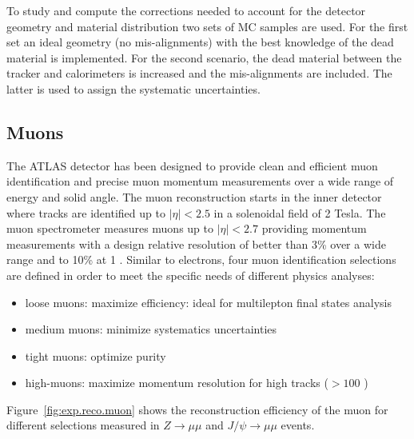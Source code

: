 To study and compute the corrections needed to account for the detector geometry and material distribution
two sets of MC samples are used. For the first set an ideal geometry (no mis-alignments) with the best
knowledge of the dead material is implemented. For the second scenario, the dead material between the
tracker and calorimeters is increased and the mis-alignments are included. The latter is used to assign the
systematic uncertainties.








\subsection{Muons}

The ATLAS detector has been designed to provide clean and efficient 
muon identification and precise muon momentum measurements over 
a wide range of energy and solid angle. 
The muon  reconstruction starts in the inner 
detector where tracks are identified up to $|\eta|<2.5$ in a solenoidal field of 2 Tesla.
The muon spectrometer  measures  muons up to $|\eta|<2.7$  
providing momentum measurements with a design relative resolution of better than 3\% over a wide 
\pt range and to 10\% at 1 \TeV.
Similar to electrons, four muon identification selections are defined in order to meet 
the specific needs of different physics analyses:
\begin{itemize}
\item loose muons: maximize efficiency: ideal for multilepton final states analysis
\item medium muons: minimize systematics uncertainties
\item tight muons: optimize  purity
\item high-\pt muons: maximize momentum resolution for high \pt tracks ($>100$ \GeV)  
\end{itemize}
Figure~\ref{fig:exp.reco.muon} shows the reconstruction efficiency of the muon for different selections measured in  $Z\to\mu\mu$ and $J/\psi\to\mu\mu$ events.

